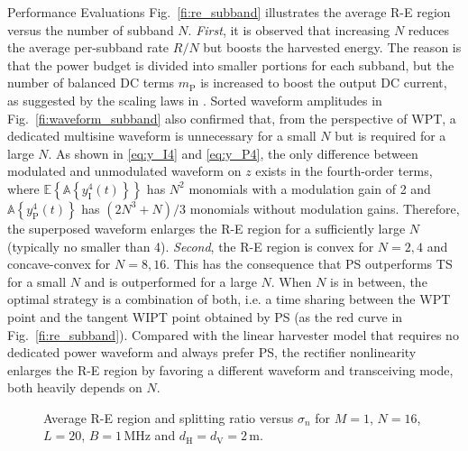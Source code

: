 \documentclass[journal]{IEEEtran}
\begin{document}
\begin{section}{Performance Evaluations}
		Fig.~\ref{fi:re_subband} illustrates the average R-E region versus the number of subband $N$. \textit{First}, it is observed that increasing $N$ reduces the average per-subband rate $R/N$ but boosts the harvested energy. The reason is that the power budget is divided into smaller portions for each subband, but the number of balanced DC terms $m_\mathrm{P}$ is increased to boost the output DC current, as suggested by the scaling laws in \cite{Clerckx2018b}. Sorted waveform amplitudes in Fig.~\ref{fi:waveform_subband} also confirmed that, from the perspective of WPT, a dedicated multisine waveform is unnecessary for a small $N$ but is required for a large $N$. As shown in \eqref{eq:y_I4} and \eqref{eq:y_P4}, the only difference between modulated and unmodulated waveform on $z$ exists in the fourth-order terms, where $\mathbb{E}\left\{\mathbb{A}\left\{y_{\mathrm{I}}^4(t)\right\}\right\}$ has $N^2$ monomials with a modulation gain of \num{2} and $\mathbb{A}\left\{y_{\mathrm{P}}^4(t)\right\}$ has $(2N^3+N)/3$ monomials without modulation gains. Therefore, the superposed waveform enlarges the R-E region for a sufficiently large $N$ (typically no smaller than 4). \textit{Second}, the R-E region is convex for $N = 2, 4$ and concave-convex for $N = 8, 16$. This has the consequence that PS outperforms TS for a small $N$ and is outperformed for a large $N$. When $N$ is in between, the optimal strategy is a combination of both, i.e. a time sharing between the WPT point and the tangent WIPT point obtained by PS (as the red curve in Fig.~\ref{fi:re_subband}). Compared with the linear harvester model that requires no dedicated power waveform and always prefer PS, the rectifier nonlinearity enlarges the R-E region by favoring a different waveform and transceiving mode, both heavily depends on $N$.

		\begin{figure}[!t]
			\centering
			\begin{adjustbox}{width=0.9\columnwidth}
				
			\end{adjustbox}
			\caption{Average R-E region and splitting ratio versus $\sigma_n$ for $M=1$, $N=16$, $L=20$, $B=1\,\si{\MHz}$ and $d_{\mathrm{H}}=d_{\mathrm{V}}=2\,\si{\meter}$.}
			\label{fi:re_noise}
		\end{figure}


\end{section}
\end{document}
